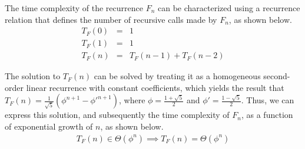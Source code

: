 \documentclass[11pt]{article}
\begin{document}
\begin{prob}{1}
\end{prob}
\begin{sol} 

The time complexity of the recurrence $F_{n}$ can be characterized using a recurrence relation that defines the number of recursive calls made by $F_{n}$, as shown below.
\begin{eqnarray*}
T_{F}(0) & = & 1 \\
T_{F}(1) & = & 1 \\
T_{F}(n) & = & T_{F}(n-1) + T_{F}(n-2)
\end{eqnarray*}

The solution to $T_{F}(n)$ can be solved by treating it as a homogeneous second-order linear recurrence with constant coefficients, which yields the result that $T_{F}(n) = \frac{1}{\sqrt{5}}(\phi^{n+1} - \phi'^{n+1})$, where $\phi = \frac{1 + \sqrt{5}}{2}$ and $\phi' = \frac{1 - \sqrt{5}}{2}$. Thus, we can express this solution, and subsequently the time complexity of $F_{n}$, as a function of exponential growth of $n$, as shown below. 
\begin{eqnarray*}
T_{F}(n) \in \Theta(\phi^{n}) \implies T_{F}(n) = \Theta(\phi^{n})
\end{eqnarray*}

\end{sol}
\end{document}
